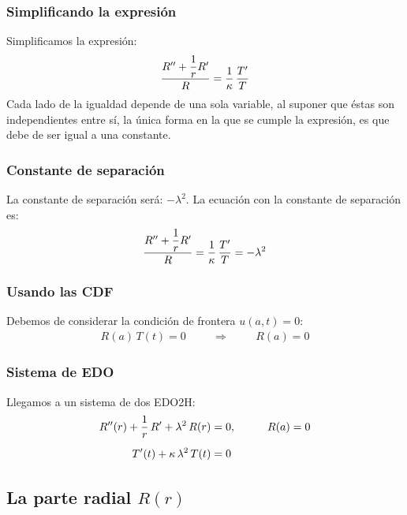 \documentclass[12pt]{beamer}
\begin{document}
\begin{frame}
\frametitle{Simplificando la expresión}
Simplificamos la expresión:
\pause
\begin{align*}
\dfrac{{R}^{\prime \prime} + \dfrac{1}{r} {R}^{\prime}}{R} = \dfrac{1}{\kappa} \, \dfrac{{T}^{\prime}}{T}
\end{align*}
\pause
Cada lado de la igualdad depende de una sola variable, al suponer que éstas son independientes entre sí, la única forma en la que se cumple la expresión, es que debe de ser igual a una constante.
\end{frame}
\begin{frame}
\frametitle{Constante de separación}
La constante de separación será: $-\lambda^{2}$. \pause La ecuación con la constante de separación es:
\pause
\begin{align*}
\dfrac{{R}^{\prime \prime} + \dfrac{1}{r} {R}^{\prime}}{R} = \dfrac{1}{\kappa} \, \dfrac{{T}^{\prime}}{T} = -\lambda^{2}
\end{align*}
\end{frame}
\begin{frame}
\frametitle{Usando las CDF}
Debemos de considerar la condición de frontera $u (a, t) = 0$:
\pause
\begin{align*}
R (a) \, T (t) = 0 \hspace{1cm} \Rightarrow \hspace{1cm} R (a) = 0
\end{align*}
\end{frame}
\begin{frame}
\frametitle{Sistema de EDO}
Llegamos a un sistema de dos EDO2H:
\pause
\begin{align}
{R}^{\prime \prime} (r) + \dfrac{1}{r} \, {R}^{\prime} + \lambda^{2} \, R (r) &= 0, \hspace{1cm} R (a) = 0 \label{eq:ecuacion_CilBessel_03} \\[0.5em]  
{T}^{\prime} (t) + \kappa \, \lambda^{2} \, T (t) &= 0 \label{eq:ecuacion_CilBessel_04}
\end{align}
\end{frame}

\subsection{La parte radial \texorpdfstring{$R (r)$}{R (r)}}
\end{document}
